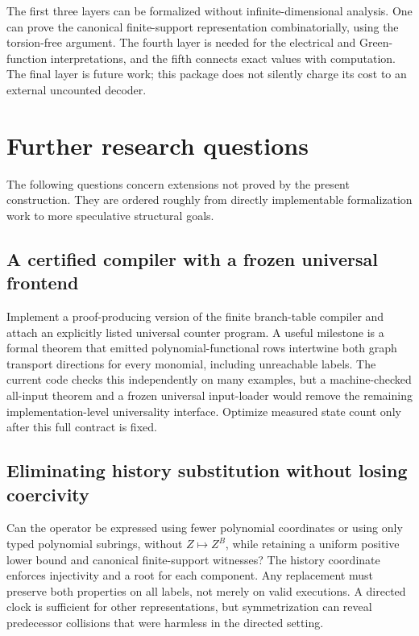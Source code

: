\documentclass[11pt,letterpaper]{article}
\theoremstyle{definition}
\theoremstyle{remark}
\begin{document}
The first three layers can be formalized without infinite-dimensional
analysis. One can prove the canonical finite-support representation
combinatorially, using the torsion-free argument. The fourth layer is
needed for the electrical and Green-function interpretations, and the
fifth connects exact values with computation. The final layer is future
work; this package does not silently charge its cost to an external
uncounted decoder.

\section{Further research questions}\label{ste:cg:sec:research}
The following questions concern extensions not proved by the present
construction. They are ordered roughly from directly implementable
formalization work to more speculative structural goals.

\subsection{A certified compiler with a frozen universal frontend}\label{ste:cg:q:frontend}
Implement a proof-producing version of the finite branch-table compiler
and attach an explicitly listed universal counter program. A useful
milestone is a formal theorem that emitted polynomial-functional rows
intertwine both graph transport directions for every monomial, including
unreachable labels. The current code checks this independently on many
examples, but a machine-checked all-input theorem and a frozen universal
input-loader would remove the remaining implementation-level universality
interface. Optimize measured state count only after this full contract is
fixed.

\subsection{Eliminating history substitution without losing coercivity}\label{ste:cg:q:history}
Can the operator be expressed using fewer polynomial coordinates or using
only typed polynomial subrings, without $Z\mapsto Z^B$, while retaining a
uniform positive lower bound and canonical finite-support witnesses? The
history coordinate enforces injectivity and a root for each component.
Any replacement must preserve both properties on all labels, not merely
on valid executions. A directed clock is sufficient for other
representations, but symmetrization can reveal predecessor collisions
that were harmless in the directed setting.
\end{document}
